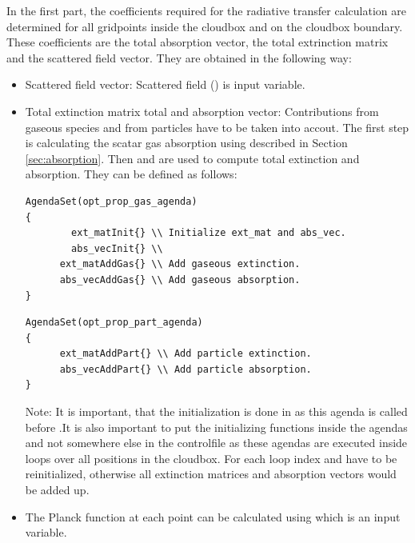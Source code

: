  In the first part, the
coefficients required for the radiative transfer calculation are
determined for all gridpoints inside the cloudbox and on the cloudbox
boundary. These coefficients are the total absorption vector, the
total extrinction matrix and the scattered field vector. They are
obtained in the following way:
\begin{itemize}
\item Scattered field vector: Scattered field
  () is input variable.
\item Total extinction matrix total and absorption vector:
  Contributions from gaseous species and from particles have to be
  taken into accout.  The first step is calculating the scatar gas
  absorption using 
  described in Section \ref{sec:absorption}.  Then
   and
   are used to compute total
  extinction and absorption. They can be defined as follows:
  
  \vspace{1ex}
\begin{minipage}{0.9\hsize}
\begin{verbatim}
AgendaSet(opt_prop_gas_agenda)
{
        ext_matInit{} \\ Initialize ext_mat and abs_vec.
        abs_vecInit{} \\ 
      ext_matAddGas{} \\ Add gaseous extinction.              
      abs_vecAddGas{} \\ Add gaseous absorption.
}
\end{verbatim}
\end{minipage} 

\vspace{1ex}
\begin{minipage}{0.9\hsize}
\begin{verbatim}
AgendaSet(opt_prop_part_agenda)
{
      ext_matAddPart{} \\ Add particle extinction.            
      abs_vecAddPart{} \\ Add particle absorption.
}
\end{verbatim}
\end{minipage} 

Note: It is important, that the initialization is done in
 as this agenda is called before
.It is also important to put the
initializing functions inside the agendas and not somewhere else in
the controlfile as these agendas are executed inside loops over all
positions in the cloudbox. For each loop index  and
 have to be reinitialized, otherwise all extinction
matrices and absorption vectors would be added up.

\item The Planck function at each point can be calculated using
   which is an input variable.

\end{itemize}

